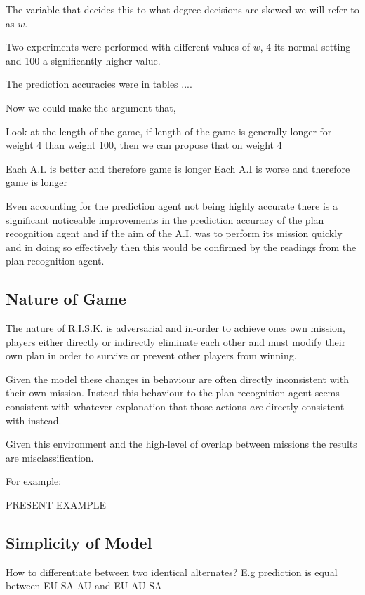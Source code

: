 \documentclass[parskip]{cs4rep}
\begin{document}
The variable that decides this to what degree decisions are skewed we will refer to as $w$.

Two experiments were performed with different values of $w$, 4 its normal setting and 100 a significantly higher value.

The prediction accuracies were in tables ....

Now we could make the argument that, 

Look at the length of the game, if length of the game is generally longer for weight 4 than weight 100, then we can propose that on weight 4

Each A.I. is better and therefore game is longer
Each A.I is worse and therefore game is longer

Even accounting for the prediction agent not being highly accurate there is a significant noticeable improvements in the prediction accuracy of the plan recognition agent and if the aim of the A.I. was to perform its mission quickly and in doing so effectively then this would be confirmed by the readings from the plan recognition agent.

\subsection{Nature of Game}

The nature of R.I.S.K. is adversarial and in-order to achieve ones own mission, players either directly or indirectly eliminate each other and must modify their own plan in order to survive or prevent other players from winning. 

Given the model these changes in behaviour are often directly inconsistent with their own mission. Instead this behaviour to the plan recognition agent seems consistent with whatever explanation that those actions \textit{are} directly consistent with instead.

Given this environment and the high-level of overlap between missions the results are misclassification.

For example:

PRESENT EXAMPLE

\subsection{Simplicity of Model}

How to differentiate between two identical alternates? E.g prediction is equal between EU SA AU and EU AU SA 
\end{document}
